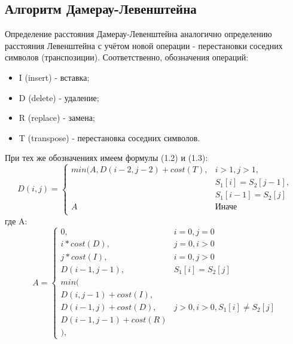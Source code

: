 \subsection{Алгоритм Дамерау-Левенштейна}
Определение расстояния Дамерау-Левенштейна аналогично определению расстояния Левенштейна с учётом новой операции - перестановки соседних символов (транспозиции). Соответственно, обозначения операций:
\begin{itemize}
    \item I (insert) - вставка;
    \item D (delete) - удаление;
    \item R (replace) - замена;
    \item T (transpose) - перестановка соседних символов.
\end{itemize}

При тех же обозначениях имеем формулы (1.2) и (1.3):
\begin{equation}
D(i,j) = \left\{ \begin{array}{ll}
 min(A, D(i - 2, j - 2) + cost(T), & \textrm{$i > 1, j > 1,$}\\
 & \textrm{$S_1[i] = S_2[j - 1],$}\\
 & \textrm{$S_1[i - 1] = S_2[j]$}\\
 A & \textrm{Иначе}\\
  \end{array} \right.
\end{equation}
где A:
\begin{equation}
A = \left\{ \begin{array}{ll}
 0, & \textrm{$i = 0, j = 0$}\\
 i * cost(D), & \textrm{$j = 0, i > 0$}\\
 j * cost(I), & \textrm{$i = 0, j > 0$}\\
 D(i - 1, j - 1), & \textrm{$S_{1}[i] = S_{2}[j]$}\\
min(\\
D(i,j-1) + cost(I),\\
D(i-1, j) + cost(D), &\textrm{$j > 0, i > 0, S_1[i] \neq S_2[j]$}\\
D(i-1, j-1) + cost(R)\\
),
  \end{array} \right.
\end{equation}

